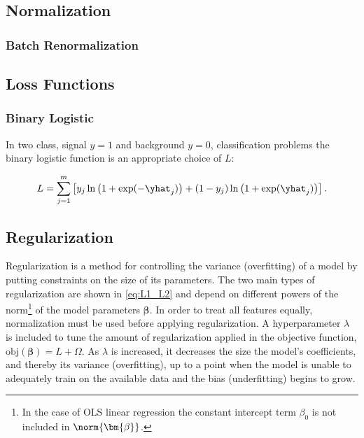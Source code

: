 \subsection{Normalization}
\label{ml:general:normalization}

\subsubsection{Batch Renormalization}
\label{ml:general:reg:batch_renorm}

\subsection{Loss Functions}
\label{ml:general:loss_Func}


\subsubsection{Binary Logistic}
\label{ml:supervised:loss_functions:binary_logistic}

In two class, signal $y=1$ and background $y=0$, classification problems the binary logistic function is an appropriate choice of $L$:

\begin{equation} \label{eq:binary_logistic}
L = \sum_{j=1}^{m} \left[y_{j} \ln\left(1 + \exp(-\yhat_{j})\right) +\left(1-y_{j}\right) \ln\left(1 + \exp(\yhat_{j})\right)\right].
\end{equation}


\subsection{Regularization}
\label{ml:general:reg}

Regularization is a method for controlling the variance (overfitting)
of a model by putting constraints on the size of its parameters.
The two main types of regularization are shown in \cref{eq:L1_L2}
and depend on different powers of the norm\footnote{In
the case of OLS linear regression the constant intercept term $\beta_{0}$ is not included in $\norm{\bm{\beta}}$.} of the model parameters $\bm{\beta}$.
In order to treat all features equally, normalization must be used before applying regularization.
A hyperparameter $\lambda$ is included to tune the amount of regularization applied in the objective function,
$\text{obj}\left(\bm{\beta}\right) = L + \Omega$.
As $\lambda$ is increased, it decreases the size the model's coefficients, and thereby its variance (overfitting),
up to a point when the model is unable to adequately train on the available data and the bias (underfitting) begins to grow.


